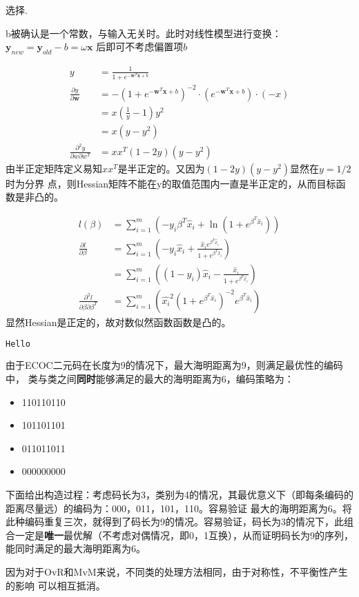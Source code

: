 \documentclass{ctexart}
\newcounter{answercnt}
\newcommand{\sCourse}{机器学习}   %
\newcommand{\nTime}{3}             %
\newcommand{\sName}{黄昊}           %
\newcommand{\sNumber}{20204205}     %
\newcommand{\homeworkTitle}{
    \setcounter{answercnt}{0}
    \begin{center}
        \fontsize{16pt}{0}{\textbf{\kaishu\sCourse课程\quad第\nTime次作业}}\\
        \fontsize{13pt}{0}{\textit{\kaishu\sName\qquad\sNumber}}\\
    \end{center}}
\begin{document}
\homeworkTitle
选择\answer[3.1]\answer[3.2]\answer[3.3]\answer[3.7]\answer[3.9].

\answer[3.1]
b被确认是一个常数，与输入无关时。此时对线性模型进行变换：$\boldsymbol{y}
_{new}=\boldsymbol{y}_{old}-{b}=\omega \boldsymbol{x}$
后即可不考虑偏置项${b}$

\answer[3.2]
\begin{equation*}
\begin{aligned}    
y&=\frac{1}{1+e^{-\boldsymbol{w}^T\boldsymbol{x}+{b}}}\\
\frac{\partial y}{\partial \boldsymbol{w}}&=-(1+e^{-\boldsymbol{w}
^T\boldsymbol{x}+{b}})^{-2}·(e^{-\boldsymbol{w}^T\boldsymbol
{x}+{b}})·(-x)\\
&={x(\frac{1}{y}-1)}{y^2}\\
&=x(y-y^2)\\
\frac{\partial^2 y}{\partial w\partial w^T}&=xx^T(1-2y)(y-y^2)
\end{aligned}
\end{equation*}
由半正定矩阵定义易知$xx^T$是半正定的。又因为$(1-2y)(y-y^2)$显然在$y=1/2$时为分界
点，则Hessian矩阵不能在y的取值范围内一直是半正定的，从而目标函数是非凸的。

$$
\begin{aligned}    
    l(\beta)&=\sum_{i=1}^{m}(-y_i\beta^T\hat{x}_i+\ln(1+e^{\beta^T\hat{x}_i}))\\
    \frac{\partial l}{\partial \beta}&=\sum_{i=1}^m(-y_i\hat {x}_i+\frac{\hat{x}_ie^{\beta^T\hat {x}_i}}{1+e^{\beta^T\hat{x}_i}})\\
    &=\sum_{i=1}^m((1-y_i)\hat {x}_i-\frac{\hat{x}_i}{1+e^{\beta^T\hat{x}_i}})\\
    \frac{\partial^2 l}{\partial \beta\partial \beta^T}&=
    \sum_{i=1}^m(\hat{x_i}^2(1+e^{\beta^T\hat{x}_i})^{-2}e^{\beta^T\hat{x}_i})
\end{aligned}
$$
显然Hessian是正定的，故对数似然函数函数是凸的。

\answer[3.3]

\begin{lstlisting}[language=python]
Hello
\end{lstlisting}

\answer[3.7]
由于ECOC二元码在长度为9的情况下，最大海明距离为9，则满足最优性的编码中，
类与类之间\textbf{同时}能够满足的最大的海明距离为6，编码策略为：

\begin{itemize}
    \item 110110110
    \item 101101101
    \item 011011011
    \item 000000000
\end{itemize}

下面给出构造过程：考虑码长为3，类别为4的情况，其最优意义下（即每条编码的距离尽量远）的编码为：000，011，101，110。容易验证
最大的海明距离为6。将此种编码重复三次，就得到了码长为9的情况。容易验证，码长为3的情况下，此组合一定是\textbf{唯一}最优解（不考虑对偶情况，即0，1互换），从而证明码长为9的序列，能同时满足的最大海明距离为6。

\answer[3.9]
因为对于OvR和MvM来说，不同类的处理方法相同，由于对称性，不平衡性产生的影响
可以相互抵消。
\end{document}
